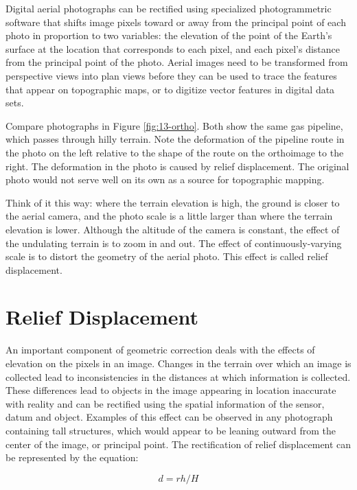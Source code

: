 \documentclass[
]{book}
\begin{document}
Digital aerial photographs can be rectified using specialized
photogrammetric software that shifts image pixels toward or away from
the principal point of each photo in proportion to two variables: the
elevation of the point of the Earth's surface at the location that
corresponds to each pixel, and each pixel's distance from the principal
point of the photo. Aerial images need to be transformed from
perspective views into plan views before they can be used to trace the
features that appear on topographic maps, or to digitize vector features
in digital data sets.

Compare photographs in Figure \ref{fig:13-ortho}. Both show the same
gas pipeline, which passes through hilly terrain. Note the deformation
of the pipeline route in the photo on the left relative to the shape of
the route on the orthoimage to the right. The deformation in the photo
is caused by relief displacement. The original photo would not serve
well on its own as a source for topographic mapping.

Think of it this way: where the terrain elevation is high, the ground is
closer to the aerial camera, and the photo scale is a little larger than
where the terrain elevation is lower. Although the altitude of the
camera is constant, the effect of the undulating terrain is to zoom in
and out. The effect of continuously-varying scale is to distort the
geometry of the aerial photo. This effect is called relief displacement.

\hypertarget{relief-displacement}{%
\section{\texorpdfstring{\textbf{Relief Displacement}}{Relief Displacement}}\label{relief-displacement}}

An important component of geometric correction deals with the effects of
elevation on the pixels in an image. Changes in the terrain over which
an image is collected lead to inconsistencies in the distances at which
information is collected. These differences lead to objects in the image
appearing in location inaccurate with reality and can be rectified using
the spatial information of the sensor, datum and object. Examples of
this effect can be observed in any photograph containing tall
structures, which would appear to be leaning outward from the center of
the image, or principal point. The rectification of relief displacement
can be represented by the equation:

\begin{equation}
d = rh/H
\label{eq:ortho}
\end{equation}
\end{document}
